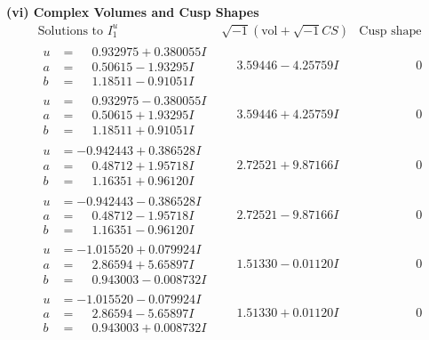 \documentclass[1p]{elsarticle_modified}
\theoremstyle{definition}
\newcommand{\I}{\sqrt{-1}}
\begin{document}
\newpage\flushleft \textbf{(vi) Complex Volumes and Cusp Shapes}
$$\begin{array}{c|c|c}  
\text{Solutions to }I^u_{1}& \I (\text{vol} + \sqrt{-1}CS) & \text{Cusp shape}\\
 \hline 
\begin{aligned}
u &= \phantom{-}0.932975 + 0.380055 I \\
a &= \phantom{-}0.50615 - 1.93295 I \\
b &= \phantom{-}1.18511 - 0.91051 I\end{aligned}
 & \phantom{-}3.59446 - 4.25759 I & \phantom{-0.000000 } 0 \\ \hline\begin{aligned}
u &= \phantom{-}0.932975 - 0.380055 I \\
a &= \phantom{-}0.50615 + 1.93295 I \\
b &= \phantom{-}1.18511 + 0.91051 I\end{aligned}
 & \phantom{-}3.59446 + 4.25759 I & \phantom{-0.000000 } 0 \\ \hline\begin{aligned}
u &= -0.942443 + 0.386528 I \\
a &= \phantom{-}0.48712 + 1.95718 I \\
b &= \phantom{-}1.16351 + 0.96120 I\end{aligned}
 & \phantom{-}2.72521 + 9.87166 I & \phantom{-0.000000 } 0 \\ \hline\begin{aligned}
u &= -0.942443 - 0.386528 I \\
a &= \phantom{-}0.48712 - 1.95718 I \\
b &= \phantom{-}1.16351 - 0.96120 I\end{aligned}
 & \phantom{-}2.72521 - 9.87166 I & \phantom{-0.000000 } 0 \\ \hline\begin{aligned}
u &= -1.015520 + 0.079924 I \\
a &= \phantom{-}2.86594 + 5.65897 I \\
b &= \phantom{-}0.943003 - 0.008732 I\end{aligned}
 & \phantom{-}1.51330 - 0.01120 I & \phantom{-0.000000 } 0 \\ \hline\begin{aligned}
u &= -1.015520 - 0.079924 I \\
a &= \phantom{-}2.86594 - 5.65897 I \\
b &= \phantom{-}0.943003 + 0.008732 I\end{aligned}
 & \phantom{-}1.51330 + 0.01120 I & \phantom{-0.000000 } 0 \\ \hline\begin{aligned}

\end{aligned}
\end{array}$$
\end{document}

